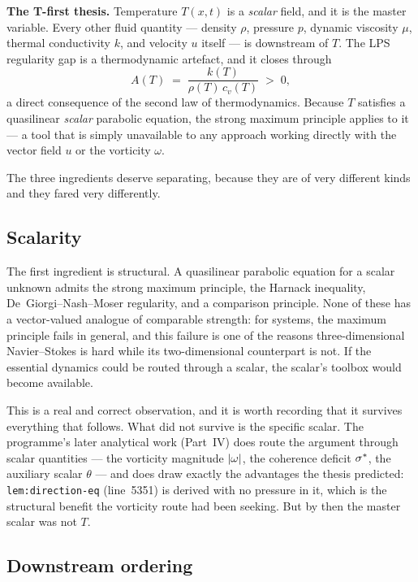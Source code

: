 \begin{record}
\textbf{The T-first thesis.} Temperature \(T(x,t)\) is a \emph{scalar} field,
and it is the master variable. Every other fluid quantity --- density
\(\rho\), pressure \(p\), dynamic viscosity \(\mu\), thermal conductivity
\(k\), and velocity \(u\) itself --- is downstream of \(T\). The LPS
regularity gap is a thermodynamic artefact, and it closes through
\[
  A(T) \;=\; \frac{k(T)}{\rho(T)\,c_v(T)} \;>\; 0 ,
\]
a direct consequence of the second law of thermodynamics. Because \(T\)
satisfies a quasilinear \emph{scalar} parabolic equation, the strong maximum
principle applies to it --- a tool that is simply unavailable to any approach
working directly with the vector field \(u\) or the vorticity \(\omega\).
\end{record}

The three ingredients deserve separating, because they are of very different
kinds and they fared very differently.

\subsection{Scalarity}

The first ingredient is structural. A quasilinear parabolic equation for a
scalar unknown admits the strong maximum principle, the Harnack inequality,
De~Giorgi--Nash--Moser regularity, and a comparison principle. None of these
has a vector-valued analogue of comparable strength: for systems, the maximum
principle fails in general, and this failure is one of the reasons
three-dimensional Navier--Stokes is hard while its two-dimensional counterpart
is not. If the essential dynamics could be routed through a scalar, the
scalar's toolbox would become available.

This is a real and correct observation, and it is worth recording that it
survives everything that follows. What did not survive is the specific
scalar. The programme's later analytical work (Part~IV) does route the
argument through scalar quantities --- the vorticity magnitude
\(\left|\omega\right|\), the coherence deficit \(\sigma^{*}\), the auxiliary scalar
\(\theta\) --- and does draw exactly the advantages the thesis predicted:
\texttt{lem:direction-eq} (line~5351) is derived with no pressure in it, which
is the structural benefit the vorticity route had been seeking. But by then
the master scalar was not \(T\).

\subsection{Downstream ordering}

